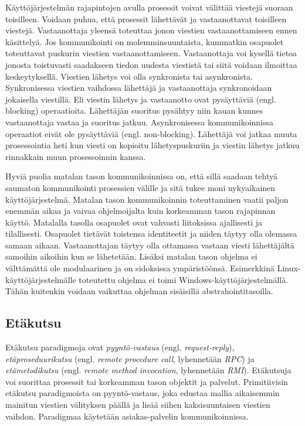 Käyttöjärjestelmän rajapintojen avulla prosessit voivat välittää viestejä suoraan toisilleen. Voidaan puhua, että prosessit lähettävät ja vastaanottavat toisilleen viestejä. Vastaanottaja yleensä toteuttaa jonon viestien vastaanottamiseen ennen käsittelyä. Jos kommunikointi on molemminsuuntaista, kummatkin osapuolet toteuttavat puskurin viestien vastaanottamiseen. Vastaanottaja voi kysellä tietoa jonosta toistuvasti saadakseen tiedon uudesta viestistä tai siitä voidaan ilmoittaa keskeytyksellä. Viestien lähetys voi olla synkronista tai asynkronista. Synkronisessa viestien vaihdossa lähettäjä ja vastaanottaja synkronoidaan jokaisella viestillä. Eli viestin lähetys ja vastaanotto ovat pysäyttäviä (engl. blocking) operaatioita. Lähettäjän suoritus pysähtyy niin kauan kunnes vastaanottaja vastaa ja suoritus jatkuu. Asynkronisessa kommunikoinnissa operaatiot eivät ole pysäyttäviä (engl. non-blocking). Lähettäjä voi jatkaa muuta prosessointia heti kun viesti on kopioitu lähetyspuskuriin ja viestin lähetys jatkuu rinnakkain muun prosessoinnin kanssa. \mbox{\cite[s.~147--148]{distributed-systems-concepts-and-design}}

Hyviä puolia matalan tason kommunikoinnissa on, että sillä saadaan tehtyä saumaton kommunikointi prosessien välille ja sitä tukee moni nykyaikainen käyttöjärjestelmä. Matalan tason kommunikoinnin toteuttaminen vaatii paljon enemmän aikaa ja vaivaa ohjelmoijalta kuin korkeamman tason rajapinnan käyttö. Matalalla tasolla osapuolet ovat vahvasti liitoksissa ajallisesti ja tilallisesti. Osapuolet tietävät toistensa identiteetit ja niiden täytyy olla olemassa samaan aikaan. Vastaanottajan täytyy olla ottamassa vastaan viesti lähettäjältä samoihin aikoihin kun se lähetetään. Lisäksi matalan tason ohjelma ei välttämättä ole modulaarinen ja on sidoksissa ympäristöönsä. Esimerkkinä Linux-käyt\-tö\-jär\-jes\-tel\-mäl\-le toteutettu ohjelma ei toimi Windows-käyttöjärjestelmällä. Tähän kuitenkin voidaan vaikuttaa ohjelman sisäisillä abstrahointitasoilla.


\subsection{Etäkutsu}
\label{ch:remote-invocation}
Etäkutsu paradigmoja ovat \emph{pyyntö-vastaus} (engl. \emph{request-reply}), \emph{etäproseduurikutsu} (engl. \emph{remote procedure call}, lyhennetään \emph{RPC}) ja \emph{etämetodikutsu} (engl. \emph{remote method invocation}, lyhennetään \emph{RMI}). Etäkutsuja voi suorittaa prosessit tai korkeamman tason objektit ja palvelut. Primitiivisin etäkutsu paradigmoista on pyyntö-vastaus, joka edustaa mallia aikaisemmin mainitun viestien välityksen päällä ja lisää siihen kaksisuuntaisen viestien vaihdon. Paradigmaa käytetään asiakas-palvelin kommunikoinnissa. \mbox{\cite[s.~185--186]{distributed-systems-concepts-and-design}}

